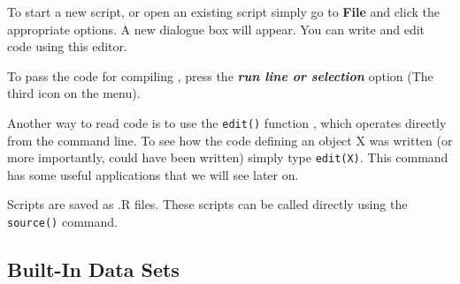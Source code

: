 \documentclass[a4paper,12pt]{article}
\begin{document}
To start a new script, or open an existing script simply go to \textbf{File} and click the appropriate options.
A new dialogue box will appear. You can write and edit code using this editor.

To pass the code for compiling , press the \textbf{\textit{run line or selection}} option (The third icon on the menu).

Another way to read code is to use the \texttt{edit()} function , which operates directly from the command line. To see how the code defining an object X was written (or more importantly, could have been written) simply type \texttt{edit(X)}. This command has some useful applications that we will see later on.

Scripts are saved as .R files. These scripts can be called directly using the \texttt{source()} command.





\subsection{Built-In Data Sets} %
\end{document}
